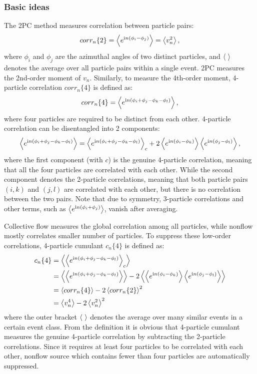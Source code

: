 \subsubsection{Basic ideas}
\label{sec:sub_basic_ideas}

The 2PC method measures correlation between particle pairs:
\begin{equation}
corr_n\{2\} = \left\langle e^{\text{i}n(\phi_i-\phi_j)}\right\rangle = \left\langle v_n^2\right\rangle,
\end{equation}
where $\phi_i$ and $\phi_j$ are the azimuthal angles of two distinct particles, and $\left\langle \text{ }\right\rangle$ denotes the average over all particle pairs within a single event. 2PC measures the 2nd-order moment of $v_n$. Similarly, to measure the 4th-order moment, 4-particle correlation $corr_n\{4\}$ is defined as:
\begin{equation}
corr_n\{4\} = \left\langle e^{\text{i}n(\phi_i+\phi_j-\phi_k-\phi_l)}\right\rangle,
\end{equation}
where four particles are required to be distinct from each other. 4-particle correlation can be disentangled into 2 components:
\begin{equation}
\left\langle e^{\text{i}n(\phi_i+\phi_j-\phi_k-\phi_l)}\right\rangle = \left\langle e^{\text{i}n(\phi_i+\phi_j-\phi_k-\phi_l)}\right\rangle_c + 2 \left\langle e^{\text{i}n(\phi_i-\phi_k)}\right\rangle \left\langle e^{\text{i}n(\phi_j-\phi_l)}\right\rangle,
\end{equation}
where the first component (with $c$) is the genuine 4-particle correlation, meaning that all the four particles are correlated with each other. While the second component denotes the 2-particle correlations, meaning that both particle pairs $(i,k)$ and $(j,l)$ are correlated with each other, but there is no correlation between the two pairs. Note that due to symmetry, 3-particle correlations and other terms, such as $\left\langle e^{\text{i}n(\phi_i+\phi_j)}\right\rangle$, vanish after averaging.

Collective flow measures the global correlation among all particles, while nonflow mostly correlates smaller number of particles. To suppress these low-order correlations, 4-particle cumulant $c_n\{4\}$ is defined as:
\begin{equation}
\begin{split}
c_n\{4\} &= \left\langle \left\langle e^{\text{i}n(\phi_i+\phi_j-\phi_k-\phi_l)}\right\rangle_c\right\rangle \\
&= \left\langle \left\langle e^{\text{i}n(\phi_i+\phi_j-\phi_k-\phi_l)}\right\rangle\right\rangle - 2 \left\langle \left\langle e^{\text{i}n(\phi_i-\phi_k)}\right\rangle \left\langle e^{\text{i}n(\phi_j-\phi_l)}\right\rangle\right\rangle \\
&= \left\langle corr_n\{4\}\right\rangle - 2 \left\langle corr_n\{2\}\right\rangle^2 \\
&= \left\langle v_n^4\right\rangle - 2\left\langle v_n^2\right\rangle^2
\end{split}
\end{equation}
where the outer bracket $\left\langle \text{ }\right\rangle$ denotes the average over many similar events in a certain event class. From the definition it is obvious that 4-particle cumulant measures the genuine 4-particle correlation by subtracting the 2-particle correlations. Since it requires at least four particles to be correlated with each other, nonflow source which contains fewer than four particles are automatically suppressed.

